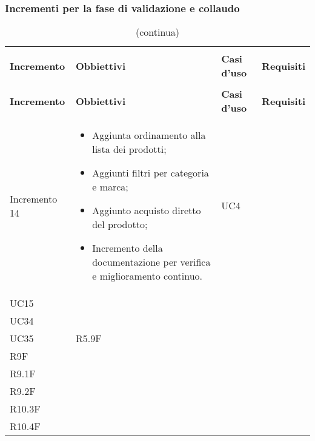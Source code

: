 \renewcommand{\arraystretch}{1}
\subsubsection{Incrementi per la fase di validazione e collaudo}
\renewcommand{\arraystretch}{1.5}
\begin{longtable}{
    >{\centering}p{}
    >{\raggedright}p{}
    >{\centering}p{}
    >{\centering}p{}
    }

    \caption{Tabella di tracciamento per la validazione}                                                                           \\
    \rowcolor{white}                                                                                                               \\
    \rowcolor{logo!70}
    \centering\textbf{Incremento} & \centering\textbf{Obbiettivi}  & \centering\textbf{Casi d'uso}  & \centering\textbf{Requisiti}
    \tabularnewline
    \endfirsthead
    \rowcolor{white}\caption[]{(continua)}                                                                                         \\
    \rowcolor{logo!70}
    \centering\textbf{Incremento} & \centering\textbf{Obbiettivi}  & \centering\textbf{Casi d'uso}  & \centering\textbf{Requisiti}
    \tabularnewline
    \endhead
    Incremento 14                 & \vspace{-15px}
    \begin{itemize}
        \renewcommand\labelitemi{-}
        \item Aggiunta ordinamento alla lista dei prodotti;
        \item Aggiunti filtri per categoria e marca;
        \item Aggiunto acquisto diretto del prodotto;
        \item Incremento della documentazione per verifica e miglioramento continuo.
    \end{itemize}    & UC4                                                                                            \\ UC15 \\ UC34 \\ UC35  & R5.9F \\ R9F \\ R9.1F \\ R9.2F \\ R10.3F \\ R10.4F

\end{longtable}
